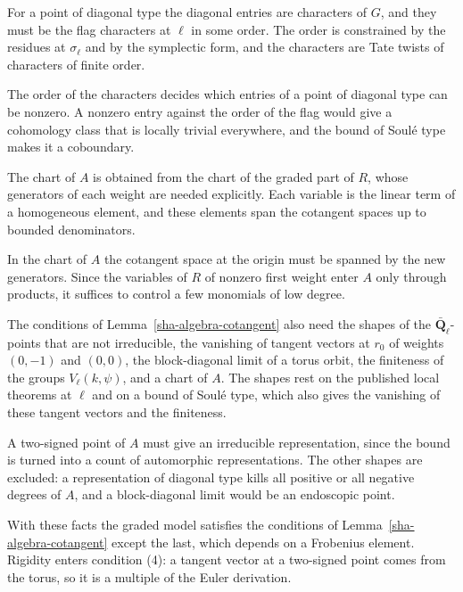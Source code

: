 For a point of diagonal type the diagonal entries are characters of $G$, and they must be the flag characters at $\ell$ in some order. The order is constrained by the residues at $\sigma_\ell$ and by the symplectic form, and the characters are Tate twists of characters of finite order.

The order of the characters decides which entries of a point of diagonal type can be nonzero. A nonzero entry against the order of the flag would give a cohomology class that is locally trivial everywhere, and the bound of Soulé type makes it a coboundary.

The chart of $A$ is obtained from the chart of the graded part of $R$, whose generators of each weight are needed explicitly. Each variable is the linear term of a homogeneous element, and these elements span the cotangent spaces up to bounded denominators.

In the chart of $A$ the cotangent space at the origin must be spanned by the new generators. Since the variables of $R$ of nonzero first weight enter $A$ only through products, it suffices to control a few monomials of low degree.

The conditions of Lemma~\ref{sha-algebra-cotangent} also need the shapes of the $\bar{\mathbf Q}_\ell$-points that are not irreducible, the vanishing of tangent vectors at $r_0$ of weights $(0,-1)$ and $(0,0)$, the block-diagonal limit of a torus orbit, the finiteness of the groups $V_\ell(k,\psi)$, and a chart of $A$. The shapes rest on the published local theorems at $\ell$ and on a bound of Soulé type, which also gives the vanishing of these tangent vectors and the finiteness.

A two-signed point of $A$ must give an irreducible representation, since the bound is turned into a count of automorphic representations. The other shapes are excluded: a representation of diagonal type kills all positive or all negative degrees of $A$, and a block-diagonal limit would be an endoscopic point.

With these facts the graded model satisfies the conditions of Lemma~\ref{sha-algebra-cotangent} except the last, which depends on a Frobenius element. Rigidity enters condition (4): a tangent vector at a two-signed point comes from the torus, so it is a multiple of the Euler derivation.

